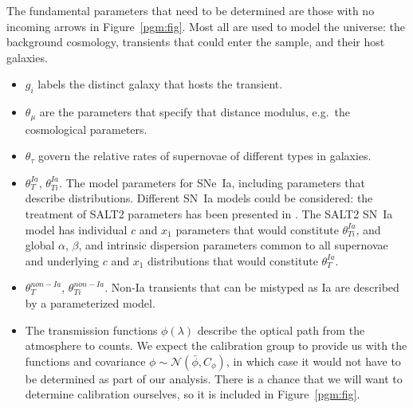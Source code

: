 \documentclass[preprint]{aastex}
\begin{document}
The fundamental parameters that need to be determined are those with no incoming arrows in Figure~\ref{pgm:fig}.  Most all are used to model the universe: 
the background cosmology, transients that could enter the sample, and their host galaxies.
\begin{itemize}
\item  $g_i$ labels the distinct galaxy that hosts the transient.
\item $\theta_\mu$ are the parameters that specify that distance modulus, e.g.\ the cosmological
parameters.
\item $\theta_\tau$ govern the relative rates of supernovae of different types in galaxies.
\item $\theta_T^{Ia}$, $\theta_{Ti}^{Ia}$.  The model parameters for SNe~Ia, including
parameters that describe distributions.
Different SN~Ia models could be considered: the treatment of SALT2 parameters
has been presented in \citet{2011MNRAS.418.2308M}.
The SALT2 SN~Ia
model has individual $c$ and $x_1$ parameters that would constitute $\theta_{Ti}^{Ia}$,
and global $\alpha$, $\beta$, and intrinsic dispersion  parameters  common to all supernovae
 and  underlying  $c$ and $x_1$ distributions that would constitute $\theta_T^{Ia}$.
\item $\theta_T^{non-Ia}$, $\theta_{Ti}^{non-Ia}$.  Non-Ia transients
that can be mistyped as Ia are described by a parameterized model.
\item The transmission functions $\phi(\lambda)$ describe the optical path from the
atmosphere to counts.  We expect
the calibration group to provide us with the functions and covariance $\phi \sim \mathcal{N}(\bar{\phi},C_\phi)$, in which case it would not have to be determined as part
of our analysis.    There is a chance that we will want to determine calibration ourselves,
so it is included in Figure~\ref{pgm:fig}.
\end{itemize}
\end{document}
